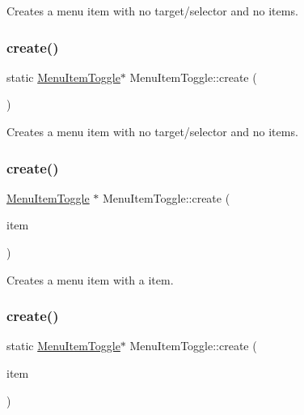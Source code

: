 Creates a menu item with no target/selector and no items. \mbox{\label{classMenuItemToggle_a0a2b3ae757446288308270f8d4364e50}} 
\subsubsection{\texorpdfstring{create()}{create()}\hspace{0.1cm}{\footnotesize\ttfamily [2/4]}}
{\footnotesize\ttfamily static \hyperlink{classMenuItemToggle}{Menu\+Item\+Toggle}$\ast$ Menu\+Item\+Toggle\+::create (\begin{DoxyParamCaption}{ }\end{DoxyParamCaption})\hspace{0.3cm}{\ttfamily [static]}}

Creates a menu item with no target/selector and no items. \mbox{\label{classMenuItemToggle_abd8d4fa7257d61bb2ef7fe9d6f476760}} 
\subsubsection{\texorpdfstring{create()}{create()}\hspace{0.1cm}{\footnotesize\ttfamily [3/4]}}
{\footnotesize\ttfamily \hyperlink{classMenuItemToggle}{Menu\+Item\+Toggle} $\ast$ Menu\+Item\+Toggle\+::create (\begin{DoxyParamCaption}\item[{\hyperlink{classMenuItem}{Menu\+Item} $\ast$}]{item }\end{DoxyParamCaption})\hspace{0.3cm}{\ttfamily [static]}}

Creates a menu item with a item. \mbox{\label{classMenuItemToggle_a8a044c56bf939f6218a9d728836cbe3e}} 
\subsubsection{\texorpdfstring{create()}{create()}\hspace{0.1cm}{\footnotesize\ttfamily [4/4]}}
{\footnotesize\ttfamily static \hyperlink{classMenuItemToggle}{Menu\+Item\+Toggle}$\ast$ Menu\+Item\+Toggle\+::create (\begin{DoxyParamCaption}\item[{\hyperlink{classMenuItem}{Menu\+Item} $\ast$}]{item }\end{DoxyParamCaption})\hspace{0.3cm}{\ttfamily [static]}}

